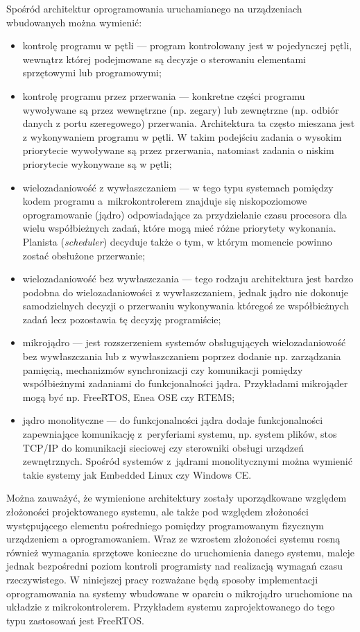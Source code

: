 \label{ref:architektury}
Spośród architektur oprogramowania uruchamianego na urządzeniach wbudowanych można wymienić:
\begin{itemize}
\item kontrolę programu w pętli ---
program kontrolowany jest w pojedynczej pętli, wewnątrz której podejmowane są decyzje o sterowaniu elementami sprzętowymi lub programowymi;
\item kontrolę programu przez przerwania --- 
konkretne części programu wywoływane są przez wewnętrzne (np. zegary) lub zewnętrzne (np. odbiór danych z portu szeregowego) przerwania.
Architektura ta często mieszana jest z wykonywaniem programu w pętli. W takim podejściu zadania o wysokim priorytecie wywoływane są przez przerwania, natomiast zadania o niskim priorytecie wykonywane są w pętli;
\item wielozadaniowość z wywłaszczaniem --- 
w tego typu systemach pomiędzy kodem programu a~mikrokontrolerem znajduje się niskopoziomowe oprogramowanie (jądro) odpowiadające za przydzielanie czasu procesora dla wielu współbieżnych zadań, które mogą mieć różne priorytety wykonania. Planista (\emph{scheduler}) decyduje także o tym, w którym momencie powinno zostać obsłużone przerwanie;
\item wielozadaniowość bez wywłaszczania ---
tego rodzaju architektura jest bardzo podobna do wielozadaniowości z wywłaszczaniem, jednak jądro nie dokonuje samodzielnych decyzji o przerwaniu wykonywania któregoś ze współbieżnych zadań lecz pozostawia tę decyzję programiście;
\item mikrojądro ---
jest rozszerzeniem systemów obsługujących wielozadaniowość bez wywłaszczania lub z wywłaszczaniem poprzez dodanie np. zarządzania pamięcią, mechanizmów synchronizacji czy komunikacji pomiędzy współbieżnymi zadaniami do funkcjonalności jądra. Przykładami mikrojąder mogą być np. FreeRTOS, Enea OSE czy RTEMS;
\item jądro monolityczne ---
do funkcjonalności jądra dodaje funkcjonalności zapewniające komunikację z~peryferiami systemu, np. system plików, stos TCP/IP do komunikacji sieciowej czy sterowniki obsługi urządzeń zewnętrznych.
Spośród systemów z~jądrami monolitycznymi można wymienić takie systemy jak Embedded Linux czy Windows CE.
\end{itemize}

Można zauważyć, że wymienione architektury zostały uporządkowane względem złożoności projektowanego systemu, ale także pod względem złożoności występującego elementu pośredniego pomiędzy programowanym fizycznym urządzeniem a oprogramowaniem. Wraz ze wzrostem złożoności systemu rosną również wymagania sprzętowe konieczne do uruchomienia danego systemu, maleje jednak bezpośredni poziom kontroli programisty nad realizacją wymagań czasu rzeczywistego.
W niniejszej pracy rozważane będą sposoby implementacji oprogramowania na systemy wbudowane w oparciu o mikrojądro uruchomione na układzie z mikrokontrolerem. Przykładem systemu zaprojektowanego do tego typu zastosowań jest FreeRTOS.


